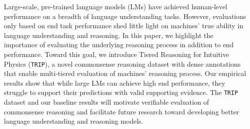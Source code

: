 Large-scale, pre-trained language models (LMs) have achieved human-level performance on a breadth of language understanding tasks. However, evaluations only based on end task performance shed little light on machines' true ability in language understanding and reasoning. In this paper, we highlight the importance of evaluating the underlying reasoning process in addition to end performance. Toward this goal, we introduce Tiered Reasoning for Intuitive Physics (\texttt{TRIP}), a novel commonsense reasoning dataset with dense annotations that enable multi-tiered evaluation of machines' reasoning process. Our empirical results show that while large LMs can achieve high end performance, they struggle to support their predictions with valid supporting evidence. The \texttt{TRIP} dataset and our baseline results will motivate verifiable evaluation of commonsense reasoning and facilitate future research toward developing better language understanding and reasoning models.